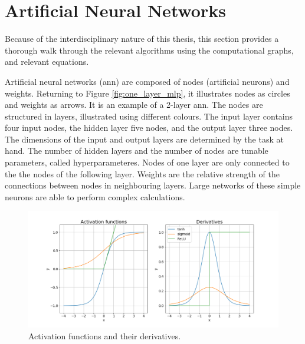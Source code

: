 \section{Artificial Neural Networks} \label{sec:artificial neural networks}
Because of the interdisciplinary nature of this thesis, this section provides a thorough walk through the relevant algorithms using the computational graphs, and relevant equations. 

Artificial neural networks (\acrshort{ann}) are composed of nodes (artificial neurons) and weights. Returning to Figure \ref{fig:one_layer_mlp}, it illustrates nodes as circles and weights as arrows. It is an example of a 2-layer \acrshort{ann}. The nodes are structured in layers, illustrated using different colours. The input layer contains four input nodes, the hidden layer five nodes, and the output layer three nodes. The dimensions of the input and output layers are determined by the task at hand. The number of hidden layers and the number of nodes are tunable parameters, called hyperparameteres. Nodes of one layer are only connected to the the nodes of the following layer. Weights are the relative strength of the connections between nodes in neighbouring layers. Large networks of these simple neurons are able to perform complex calculations.

\begin{figure}
    \centering
    \includegraphics[scale = 0.4]{Chapter3_Method/figs/activation_functions_and_derivatives.png}
    \caption{Activation functions and their derivatives.}
    \label{fig:activation_function_example}
\end{figure}

